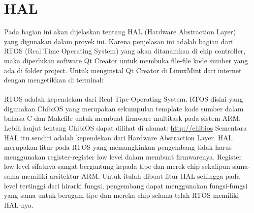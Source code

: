 \documentclass[11pt,fleqn]{book} %
\begin{document}
\section{HAL}
\begin{flushleft}
 \hspace{10pt} Pada bagian ini akan dijelaskan tentang HAL (Hardware Abstraction Layer) yang digunakan dalam proyek ini.
 Karena penjelasan ini adalah bagian dari RTOS (Real Time Operating System) yang akan ditanamkan di chip controller, 
 maka diperlukan software Qt Creator untuk membuka file-file kode sumber yang ada di folder project.
 Untuk menginstal Qt Creator di LinuxMint dari internet dengan mengetikkan di terminal:\\
\vspace{5pt}
\\
\vspace{5pt}
\hspace{10pt} RTOS adalah kependekan dari Real Tipe Operating System.
RTOS disini yang digunakan ChibiOS yang merupakan sekumpulan template kode sumber dalam bahasa C dan Makefile untuk membuat firmware multitask pada sistem ARM.
Lebih lanjut tentang ChibiOS dapat dilihat di alamat: \url{http://chibios}
\hspace{10pt} Sementara HAL itu sendiri adalah kependekan dari Hardware Abstraction Layer.
HAL merupakan fitur pada RTOS yang memungkinkan pengembang tidak harus menggunakan register-register low level dalam membuat firmwarenya.
Register low level sifatnya sangat bergantung kepada tipe dan merek chip sekalipun sama-sama memiliki arsitektur ARM.
Untuk itulah dibuat fitur HAL sehingga pada level tertinggi dari hirarki fungsi, pengembang dapat menggunakan fungsi-fungsi yang sama untuk beragam tipe dan mereka chip selama telah RTOS memiliki HAL-nya.


\end{flushleft}
\end{document}
